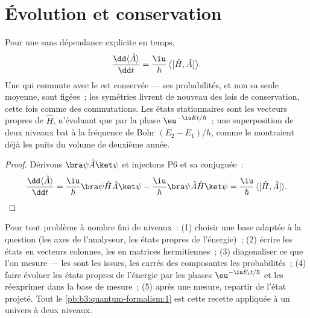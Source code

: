 \section{Évolution et conservation}

\begin{proposition}\label{prop:b3:quantum-formalism:evolution}
Pour une  sans dépendance explicite en temps,
\[
\frac{\dd\langle\hat A\rangle}{\dd t}
 = \frac{\iu}{\hbar}\,\big\langle[\hat H, \hat A]\big\rangle .
\]
Une  qui commute avec le  est conservée --- ses
probabilités, et non sa seule moyenne, sont figées~; les symétries
livrent de nouveau des lois de conservation, cette fois comme des
commutations. Les états stationnaires sont les vecteurs propres de
$\hat H$, n'évoluant que par la phase $\eu^{-\iu Et/\hbar}$~; une
superposition de deux niveaux bat à la fréquence de Bohr
$(E_2 - E_1)/h$, comme le montraient déjà les puits du volume de
deuxième année.
\end{proposition}

\begin{proof}
Dérivons $\bra\psi\hat A\ket\psi$ et injectons P6 et sa conjuguée~:
\[
\frac{\dd\langle\hat A\rangle}{\dd t}
 = \frac{\iu}{\hbar}\bra\psi\hat H\hat A\ket\psi
 - \frac{\iu}{\hbar}\bra\psi\hat A\hat H\ket\psi
 = \frac{\iu}{\hbar}\,\langle[\hat H, \hat A]\rangle .
\qedhere
\]
\end{proof}

\begin{method}\label{met:b3:quantum-formalism:method}
Pour tout problème à nombre fini de niveaux~: (1) choisir une base
adaptée à la question (les axes de l'analyseur, les états propres de
l'énergie)~; (2) écrire les états en vecteurs colonnes, les 
en matrices hermitiennes~; (3) diagonaliser ce que l'on mesure --- les
 sont les issues, les carrés des composantes les
probabilités~; (4) faire évoluer les états propres de l'énergie par les
phases $\eu^{-\iu E_it/\hbar}$ et les réexprimer dans la base de
mesure~; (5) après une mesure, repartir de l'état projeté. Tout le
\cref{pb:b3:quantum-formalism:1} est cette recette appliquée à un
univers à deux niveaux.
\end{method}

